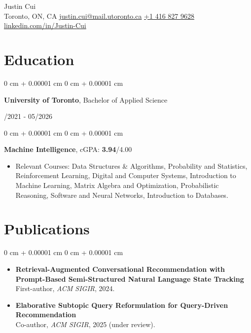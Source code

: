 \documentclass[10pt, letterpaper]{article}
\makeatletter
\newenvironment{highlights}{
    \begin{itemize}[
        topsep=0.08 cm,
        parsep=0.08 cm,
        partopsep=0pt,
        itemsep=0pt,
        leftmargin=0.2 cm + 17pt
    ]
}
{
    \end{itemize}
}
\newenvironment{onecolentry}{
    \begin{adjustwidth}{
        0 cm + 0.00001 cm
    }{
        0 cm + 0.00001 cm
    }
}{
    \end{adjustwidth}
}
\newenvironment{twocolentry}[2][]{
    \onecolentry
    \def\secondColumn{#2}
    \setcolumnwidth{\fill, 4.5 cm}
    \begin{paracol}{2}
}{
    \switchcolumn \raggedleft \secondColumn
    \end{paracol}
    \endonecolentry
}
\newcommand{\contactinfo}{
    \centering
    {\fontsize{25pt}{25pt}\selectfont Justin Cui} \\[4pt]
    \vspace{0.3cm}
    \small Toronto, ON, CA \hfill
    \href{mailto:justin.cui@mail.utoronto.ca}{justin.cui@mail.utoronto.ca} \hfill
    \href{tel:+1-416-827-9628}{+1 416 827 9628} \hfill
    \href{https://linkedin.com/in/Justin-Cui}{linkedin.com/in/Justin-Cui} \\
}
\makeatother
\begin{document}
\contactinfo
\vspace{2pt}

\section{Education}
\vspace{0.08 cm}
\begin{twocolentry}{09/2021 - 05/2026}
    {\textbf{University of Toronto}}, Bachelor of Applied Science
\end{twocolentry}
\vspace{0.11cm}
\begin{onecolentry}
\hspace{0.3cm}\textbf{Machine Intelligence},  cGPA: {\textbf{3.94}}/4.00
\vspace{0.07cm}
    \begin{highlights}
        \item Relevant Courses: Data Structures \& Algorithms, Probability and Statistics, Reinforcement Learning, Digital and Computer Systems, Introduction to Machine Learning, Matrix Algebra and Optimization, Probabilistic Reasoning, Software and Neural Networks, Introduction to Databases.
    \end{highlights}
\end{onecolentry}

\section{Publications}
\vspace{0.08 cm}
\begin{onecolentry}
    \begin{highlights}
    \item \textbf{Retrieval-Augmented Conversational Recommendation with Prompt-Based Semi-Structured Natural Language State Tracking} \\
    First-author, \textit{ACM SIGIR}, 2024.
    \vspace{0.1cm}
    \item \textbf{Elaborative Subtopic Query Reformulation for Query-Driven Recommendation} \\
    Co-author, \textit{ACM SIGIR}, 2025 (under review).
    \end{highlights}
\end{onecolentry}
\end{document}
